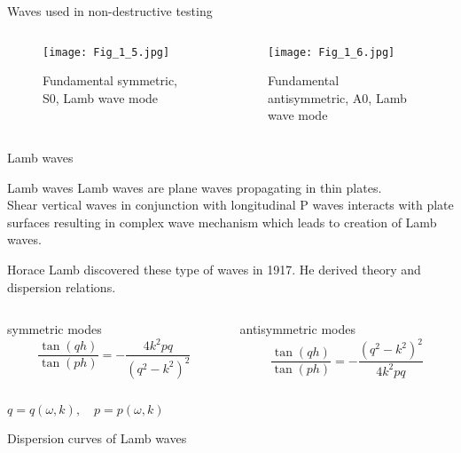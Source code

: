\documentclass[10pt,aspectratio=169,notes]{beamer} %
\begin{document}
\begin{frame}{Waves used in non-destructive testing}
\begin{columns}[T]
	\begin{column}{0.5\textwidth}
		\begin{figure}
		\texttt{[image: Fig\_1\_5.jpg]}
		\caption{Fundamental symmetric, S0, \alert{Lamb wave} mode }	
		\end{figure}
	\end{column}
	\begin{column}{0.5\textwidth}
		\begin{figure}
		\texttt{[image: Fig\_1\_6.jpg]}
		\caption{Fundamental antisymmetric, A0, \alert{Lamb wave} mode }
		\end{figure}
	\end{column}
\end{columns}	
\end{frame}
\note{
	
}
\begin{frame}{Lamb waves}
\begin{alertblock}{Lamb waves}	
		Lamb waves are plane waves propagating in thin plates.\\
		Shear vertical waves in conjunction with longitudinal P waves interacts with plate surfaces resulting in complex wave mechanism which leads to creation of Lamb waves.
\end{alertblock}
Horace Lamb discovered these type of waves in 1917.
He derived theory and dispersion relations.
\begin{columns}[T]
	\begin{column}{0.5\textwidth}
		\centering
		symmetric modes
		\begin{equation*}
		  \frac{\tan(q h)}{\tan(p h)} = -\frac{4 k^2 p q}{\left(q^2 - k^2\right)^2}
		\end{equation*}
	\end{column}
	\begin{column}{0.5\textwidth}
		\centering
		antisymmetric modes
		\begin{equation*}
		\frac{\tan(q h)}{\tan(p h)} = -\frac{\left(q^2 - k^2\right)^2}{4 k^2 p q}
		\end{equation*}
	\end{column}
\end{columns}
	
\centering
\(q=q(\omega,k), \quad p=p(\omega,k) \)
\end{frame}
\note{
	
}
\begin{frame}{Dispersion curves of Lamb waves}
\begin{figure}
\end{figure}
\end{frame}
\note{
	
}
\end{document}
